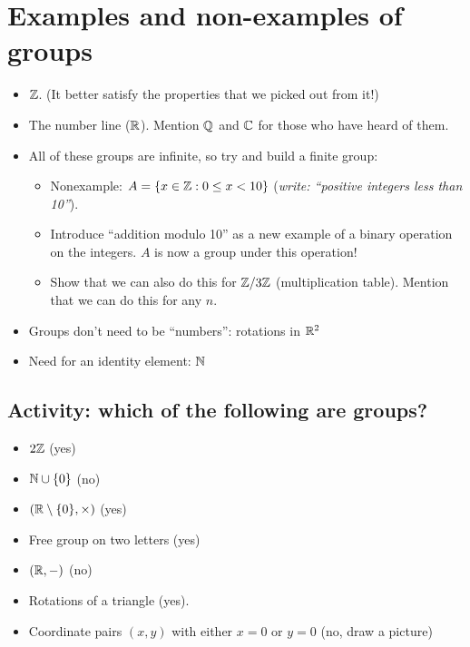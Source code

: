 \documentclass{article}
\begin{document}
\section*{Examples and non-examples of groups}
\begin{itemize}
\item $\mathbb{Z}$. (It better satisfy the properties that we picked out from
  it!)

\item The number line ($\mathbb{R}$). Mention $\mathbb{Q}$ and $\mathbb{C}$ for those who have
  heard of them. 

\item All of these groups are infinite, so try and build a
  finite group:

  \begin{itemize}

  \item Nonexample: $A = \{x \in \mathbb{Z} : 0 \le x < 10\}$ (\emph{write:
      ``positive integers less than 10''}).

  \item Introduce ``addition modulo 10'' as a new example of a binary
    operation on the integers. $A$ is now a group under this
    operation!

  \item Show that we can also do this for $\mathbb{Z}/3\mathbb{Z}$ (multiplication
    table). Mention that we can do this for any $n$.
    
  \end{itemize}

\item Groups don't need to be ``numbers'': rotations in $\mathbb{R}^2$

\item Need for an identity element: $\mathbb{N}$

\end{itemize}

\subsection*{Activity: which of the following are groups?}

\begin{itemize}
\item $2\mathbb{Z}$ (yes)
\item $\mathbb{N} \cup \{0\}$ (no)
\item $(\mathbb{R} \setminus \{0\},  \times)$ (yes)
\item Free group on two letters (yes)
\item $(\mathbb{R}, -)$ (no)
\item Rotations of a triangle (yes).
\item Coordinate pairs $(x,y)$ with either $x=0$ or $y=0$ (no, draw a
  picture)
\end{itemize}
\end{document}

